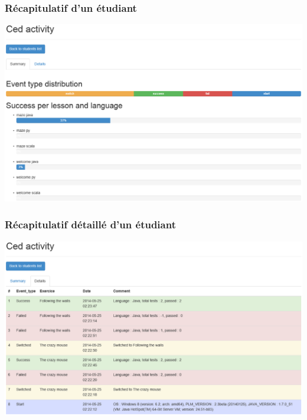 \begin{frame}
	\frametitle{Récapitulatif d'un étudiant}
	\begin{center}
		\includegraphics[scale=0.25]{images/summary.eps}
	\end{center}
\end{frame}
\begin{frame}
	\frametitle{Récapitulatif détaillé d'un étudiant}
	\begin{center}
		\includegraphics[scale=0.25]{images/details.eps}
	\end{center}
\end{frame}